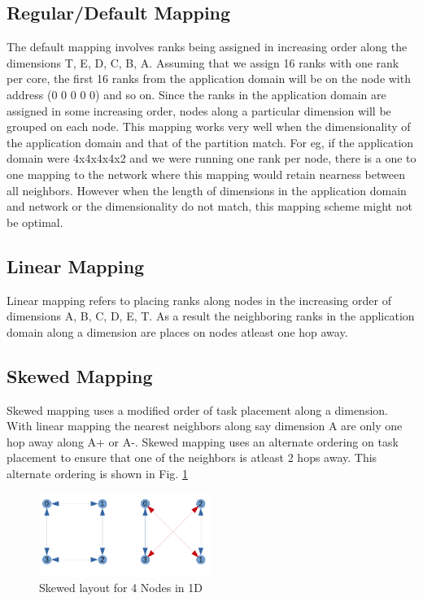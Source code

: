 \documentclass[conference,10pt]{IEEEtran}
\begin{document}
\subsection{Regular/Default Mapping}
The default mapping involves ranks being assigned in increasing order along the dimensions T, E, D, C, B, A.
Assuming that we assign 16 ranks with one rank per core, the first 16 ranks from the application domain will
be on the node with address (0 0 0 0 0) and so on. Since the ranks in the application domain are assigned in
some increasing order, nodes along a particular dimension will be grouped on each node. This mapping works
very well when the dimensionality of the application domain and that of the partition match. For eg, if the
application domain were 4x4x4x4x2 and we were running one rank per node, there is a one to one mapping to the
network where this mapping would retain nearness between all neighbors. However when the length of dimensions
in the application domain and network or the dimensionality do not match, this mapping scheme might not be
optimal.

\subsection{Linear Mapping}
Linear mapping refers to placing ranks along nodes in the increasing order of dimensions A, B, C, D, E, T.
As a result the neighboring ranks in the application domain along a dimension are places on nodes atleast
one hop away.

\subsection{Skewed Mapping}

Skewed mapping uses a modified order of task placement along a dimension.
With linear mapping the nearest neighbors along say dimension A are only one hop away along A+ or A-.
Skewed mapping uses an alternate ordering on task placement to ensure that one of the neighbors is atleast
2 hops away. This alternate ordering is shown in Fig. \ref{fig:Skewed layout for 4 Nodes in 1D}

\label{sect:Skewed mapping in 1D}
\begin{figure}
  \center
  \includegraphics[width=0.5\textwidth]{skewed_layout_cropped.pdf}
  \caption{Skewed layout for 4 Nodes in 1D}
    \label{fig:Skewed layout for 4 Nodes in 1D}
\end{figure}
\end{document}
